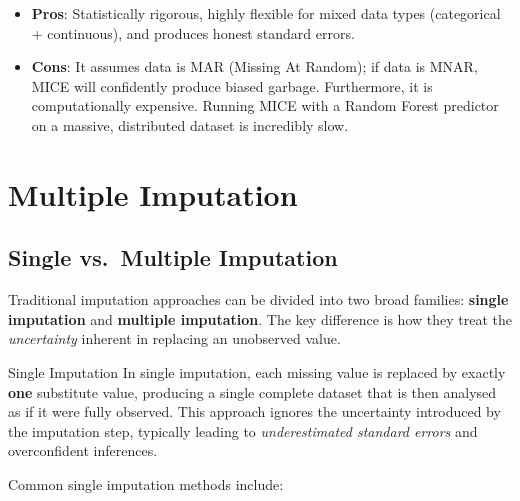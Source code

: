 \documentclass[11pt]{article}
\theoremstyle{smallexample}
\begin{document}
\begin{itemize}
    \item \textbf{Pros}: Statistically rigorous, highly flexible for mixed data types (categorical + continuous), and produces honest standard errors.
    \item \textbf{Cons}: It assumes data is MAR (Missing At Random); if data is MNAR, MICE will confidently produce biased garbage. Furthermore, it is computationally expensive. Running MICE with a Random Forest predictor on a massive, distributed dataset is incredibly slow.
\end{itemize}

\pagebreak


\section{Multiple Imputation}

\subsection{Single vs.\ Multiple Imputation}

Traditional imputation approaches can be divided into two broad families:
\textbf{single imputation} and \textbf{multiple imputation}. The key difference
is how they treat the \emph{uncertainty} inherent in replacing an unobserved value.

 \begin{defbox}{Single Imputation}
  In single imputation, each missing value is replaced by exactly \textbf{one}
  substitute value, producing a single complete dataset that is then analysed as if
  it were fully observed. This approach ignores the uncertainty introduced by the
  imputation step, typically leading to \emph{underestimated standard errors} and
  overconfident inferences.
 \end{defbox}

Common single imputation methods include:
\end{document}
